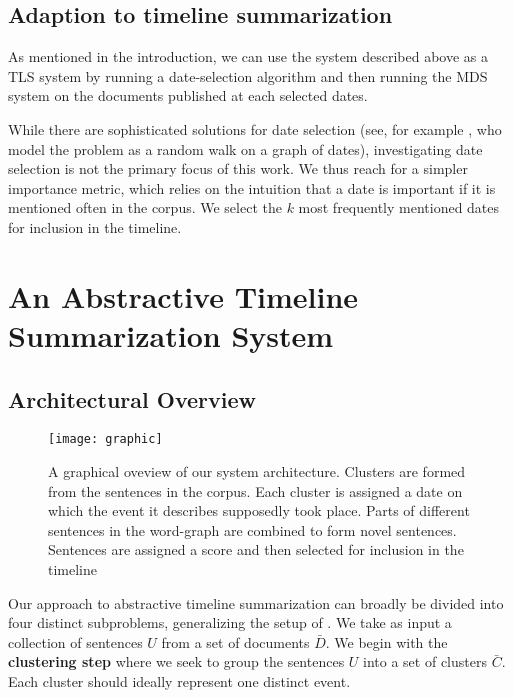 \documentclass[a4paper,BCOR=10mm]{report}
\numberwithin{lemma}{chapter}
\numberwithin{definition}{chapter}
\begin{document}
\section{Adaption to timeline summarization}

As mentioned in the introduction, we can use the system described above as a TLS system by running a date-selection algorithm and then running the MDS system on the documents published at each selected dates.

While there are sophisticated solutions for date selection (see, for example \citet{tran-datesel}, who model the problem as a random walk on a graph of dates), investigating date selection is not the primary focus of this work.
We thus reach for a simpler importance metric, which relies on the intuition that a date is important if it is mentioned often in the corpus. We select the $k$ most frequently mentioned dates for inclusion in the timeline.


\chapter{An Abstractive Timeline Summarization System} \label{sec:system}

\section{Architectural Overview}

\begin{figure}
\texttt{[image: graphic]}
\caption{A graphical oveview of our system architecture. Clusters are formed from the sentences in the corpus. Each cluster is assigned a date on which the event it describes supposedly took place. Parts of different sentences in the word-graph are combined to form novel sentences. Sentences are assigned a score and then selected for inclusion in the timeline}
\label{fig:arch-overview}
\end{figure}

Our approach to abstractive timeline summarization can broadly be divided into four distinct subproblems, generalizing the setup of \citet{banerjee}.
We take as input a collection of sentences $U$ from a set of documents $\bar{D}$.
We begin with the \textbf{clustering step} where we seek to group the sentences $U$ into a set of clusters $\bar{C}$. Each cluster should ideally represent one distinct event.
\end{document}
